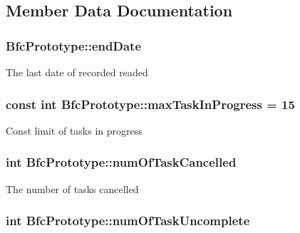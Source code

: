 \subsection{Member Data Documentation}
\hypertarget{classBfcPrototype_a88db45d376d68c919a7a43e92adf4e23}{
\subsubsection[{end\-Date}]{ Bfc\-Prototype\-::end\-Date\hspace{0.3cm}{\ttfamily [private]}}}\label{classBfcPrototype_a88db45d376d68c919a7a43e92adf4e23}
The last date of recorded readed \hypertarget{classBfcPrototype_a9549b48b56475a2f2a1bded3f3ac09a4}{
\subsubsection[{max\-Task\-In\-Progress}]{\setlength{\rightskip}{0pt plus 5cm}const int Bfc\-Prototype\-::max\-Task\-In\-Progress = 15\hspace{0.3cm}{\ttfamily [private]}}}\label{classBfcPrototype_a9549b48b56475a2f2a1bded3f3ac09a4}
Const limit of tasks in progress \hypertarget{classBfcPrototype_a1b1f3d0e3410f241e63884c11e36451a}{
\subsubsection[{num\-Of\-Task\-Cancelled}]{\setlength{\rightskip}{0pt plus 5cm}int Bfc\-Prototype\-::num\-Of\-Task\-Cancelled\hspace{0.3cm}{\ttfamily [private]}}}\label{classBfcPrototype_a1b1f3d0e3410f241e63884c11e36451a}
The number of tasks cancelled \hypertarget{classBfcPrototype_ab506fb074e721612c0838e2c37c93e09}{
\subsubsection[{num\-Of\-Task\-Uncomplete}]{\setlength{\rightskip}{0pt plus 5cm}int Bfc\-Prototype\-::num\-Of\-Task\-Uncomplete\hspace{0.3cm}{\ttfamily [private]}}}\label{classBfcPrototype_ab506fb074e721612c0838e2c37c93e09}
